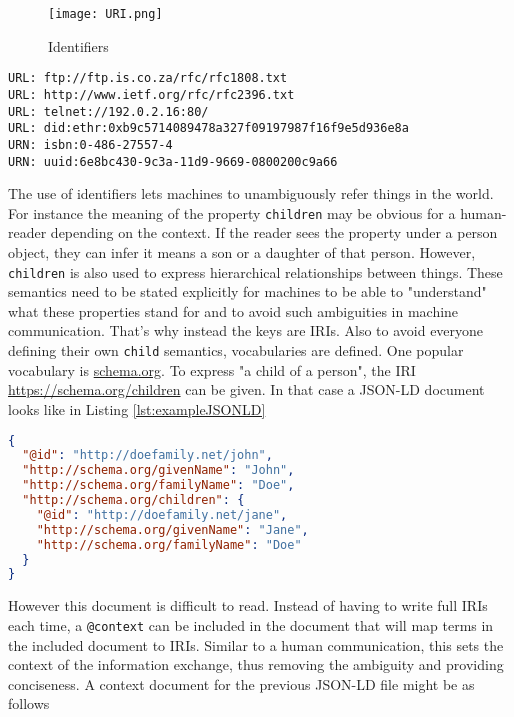 \begin{figure}[htbp]
  \centering
  \texttt{[image: URI.png]}
  \caption{Identifiers}
  \label{fig:uri}
\end{figure}

\begin{lstlisting}[label={lst:uri}, caption={URL and URN examples}]
URL: ftp://ftp.is.co.za/rfc/rfc1808.txt
URL: http://www.ietf.org/rfc/rfc2396.txt
URL: telnet://192.0.2.16:80/
URL: did:ethr:0xb9c5714089478a327f09197987f16f9e5d936e8a
URN: isbn:0-486-27557-4
URN: uuid:6e8bc430-9c3a-11d9-9669-0800200c9a66
\end{lstlisting}


The use of identifiers lets machines to unambiguously refer things in the world. For instance the meaning of the property \lstinline{children} may be obvious for a human-reader depending on the context. If the reader sees the property under a person object, they can infer it means a son or a daughter of that person. However, \lstinline{children} is also used to express hierarchical relationships between things. These semantics need to be stated explicitly for machines to be able to "understand" what these properties stand for and to avoid such ambiguities in machine communication. That's why instead the keys are \acrlong{IRI}s. Also to avoid everyone defining their own \lstinline{child} semantics, vocabularies are defined. One popular vocabulary is \url{schema.org}. To express "a child of a person", the \acrshort{IRI} \url{https://schema.org/children} can be given. In that case a \acrshort{JSON-LD} document looks like in Listing \ref{lst:exampleJSONLD}

\begin{lstlisting}[language=json, label={lst:exampleJSONLD}, caption={A JSON-LD with full \acrshort{IRI}s}]
{
  "@id": "http://doefamily.net/john",
  "http://schema.org/givenName": "John",
  "http://schema.org/familyName": "Doe",
  "http://schema.org/children": {
    "@id": "http://doefamily.net/jane",
    "http://schema.org/givenName": "Jane",
    "http://schema.org/familyName": "Doe"
  }
}
\end{lstlisting}

However this document is difficult to read. Instead of having to write full \acrshort{IRI}s each time, a \lstinline{@context} can be included in the document that will map terms in the included document to \acrshort{IRI}s. Similar to a human communication, this sets the context of the information exchange, thus removing the ambiguity and providing conciseness. A context document for the previous \acrshort{JSON-LD} file might be as follows

